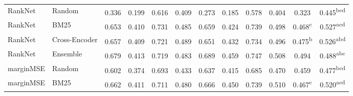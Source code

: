 \begin{table}[t]
\begin{tabular}{llcccccccccc}
  RankNet & Random & 0.336\textsuperscript{\phantom{aaa}} & 0.199\textsuperscript{\phantom{aaa}} & 0.616\textsuperscript{\phantom{aaa}} & 0.409\textsuperscript{\phantom{aaa}} & 0.273\textsuperscript{\phantom{aaa}} & 0.185\textsuperscript{\phantom{aaa}} & 0.578\textsuperscript{\phantom{aaa}} & 0.404\textsuperscript{\phantom{aaa}} & 0.323\textsuperscript{\phantom{aaa}} & 0.445\textsuperscript{bcd\phantom{}} \\
  RankNet & BM25 & 0.653\textsuperscript{\phantom{aaa}} & 0.410\textsuperscript{\phantom{aaa}} & 0.731\textsuperscript{\phantom{aaa}} & 0.485\textsuperscript{\phantom{aaa}} & 0.659\textsuperscript{\phantom{aaa}} & 0.424\textsuperscript{\phantom{aaa}} & 0.739\textsuperscript{\phantom{aaa}} & 0.498\textsuperscript{\phantom{aaa}} & 0.468\textsuperscript{c\phantom{aa}} & 0.527\textsuperscript{acd\phantom{}} \\
  RankNet & Cross-Encoder & 0.657\textsuperscript{\phantom{aaa}} & 0.409\textsuperscript{\phantom{aaa}} & 0.721\textsuperscript{\phantom{aaa}} & 0.489\textsuperscript{\phantom{aaa}} & 0.651\textsuperscript{\phantom{aaa}} & 0.432\textsuperscript{\phantom{aaa}} & 0.734\textsuperscript{\phantom{aaa}} & 0.496\textsuperscript{\phantom{aaa}} & 0.475\textsuperscript{b\phantom{aa}} & 0.526\textsuperscript{abd\phantom{}} \\
  RankNet & Ensemble & 0.679\textsuperscript{\phantom{aaa}} & 0.413\textsuperscript{\phantom{aaa}} & 0.719\textsuperscript{\phantom{aaa}} & 0.483\textsuperscript{\phantom{aaa}} & 0.689\textsuperscript{\phantom{aaa}} & 0.459\textsuperscript{\phantom{aaa}} & 0.747\textsuperscript{\phantom{aaa}} & 0.508\textsuperscript{\phantom{aaa}} & 0.494\textsuperscript{\phantom{aaa}} & 0.488\textsuperscript{abc\phantom{}} \\
  marginMSE & Random & 0.602\textsuperscript{\phantom{aaa}} & 0.374\textsuperscript{\phantom{aaa}} & 0.693\textsuperscript{\phantom{aaa}} & 0.433\textsuperscript{\phantom{aaa}} & 0.637\textsuperscript{\phantom{aaa}} & 0.415\textsuperscript{\phantom{aaa}} & 0.685\textsuperscript{\phantom{aaa}} & 0.470\textsuperscript{\phantom{aaa}} & 0.459\textsuperscript{\phantom{aaa}} & 0.477\textsuperscript{bcd\phantom{}} \\
  marginMSE & BM25 & 0.662\textsuperscript{\phantom{aaa}} & 0.411\textsuperscript{\phantom{aaa}} & 0.711\textsuperscript{\phantom{aaa}} & 0.480\textsuperscript{\phantom{aaa}} & 0.666\textsuperscript{\phantom{aaa}} & 0.450\textsuperscript{\phantom{aaa}} & 0.739\textsuperscript{\phantom{aaa}} & 0.510\textsuperscript{\phantom{aaa}} & 0.467\textsuperscript{c\phantom{aa}} & 0.520\textsuperscript{acd\phantom{}} \\

\end{tabular}
\end{table}
